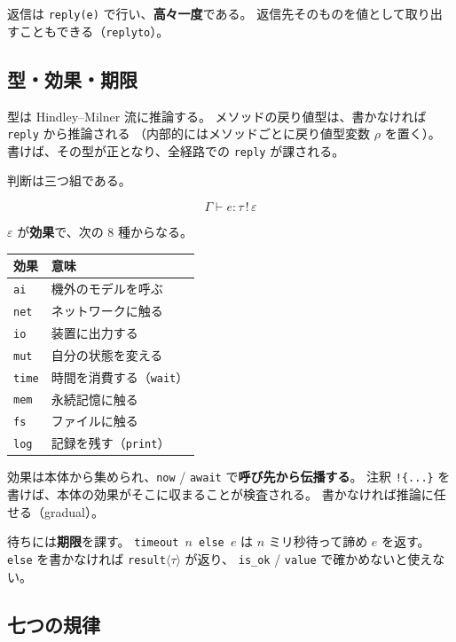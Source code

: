 \documentclass[11pt,a4paper]{ltjsarticle}
\theoremstyle{definition}
\theoremstyle{remark}
\begin{document}
返信は \texttt{reply(e)} で行い、\textbf{高々一度}である。
返信先そのものを値として取り出すこともできる（\texttt{replyto}）。

\subsection{型・効果・期限}

型は Hindley--Milner 流に推論する。
メソッドの戻り値型は、書かなければ \texttt{reply} から推論される
（内部的にはメソッドごとに戻り値型変数 $\rho$ を置く）。
書けば、その型が正となり、全経路での \texttt{reply} が課される。

判断は三つ組である。

\[
\Gamma \vdash e : \tau \,!\, \varepsilon
\]

$\varepsilon$ が\textbf{効果}で、次の 8 種からなる。

\begin{center}
\begin{tabular}{ll}
\toprule
効果 & 意味 \\
\midrule
\texttt{ai} & 機外のモデルを呼ぶ \\
\texttt{net} & ネットワークに触る \\
\texttt{io} & 装置に出力する \\
\texttt{mut} & 自分の状態を変える \\
\texttt{time} & 時間を消費する（\texttt{wait}） \\
\texttt{mem} & 永続記憶に触る \\
\texttt{fs} & ファイルに触る \\
\texttt{log} & 記録を残す（\texttt{print}） \\
\bottomrule
\end{tabular}
\end{center}

効果は本体から集められ、\texttt{now} / \texttt{await} で\textbf{呼び先から伝播する}。
注釈 \texttt{!\{...\}} を書けば、本体の効果がそこに収まることが検査される。
書かなければ推論に任せる（gradual）。

待ちには\textbf{期限}を課す。
\texttt{timeout $n$ else $e$} は $n$ ミリ秒待って諦め $e$ を返す。
\texttt{else} を書かなければ \texttt{result}$\langle\tau\rangle$ が返り、
\texttt{is\_ok} / \texttt{value} で確かめないと使えない。

\subsection{七つの規律}
\end{document}
